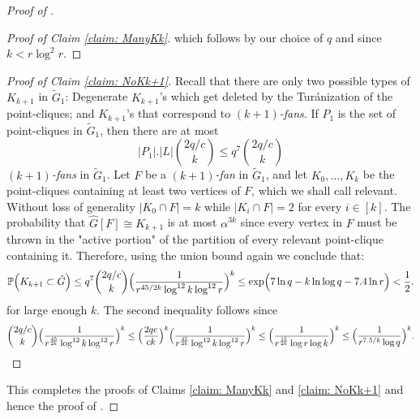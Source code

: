\documentclass[12pt]{article}
\newcommand{\red}[1]{\textcolor{red}{#1}}
\theoremstyle{definition}
\begin{document}
\begin{proof}[Proof of ]
\begin{proof}[Proof of Claim \ref{claim: ManyKk}]
        
			which follows by our choice of $q$ and since $k < r \log^2 r$.
		\end{proof}
		\begin{proof}[Proof of Claim \ref{claim: NoKk+1}] Recall that there are only two possible types of $K_{k+1}$ in $\tilde{G}_1$: Degenerate $K_{k+1}$'s which get deleted by the Turánization of the point-cliques; and $K_{k+1}$'s that correspond to $(k+1)$\textit{-fans}. If $P_1$ is the set of point-cliques in $\tilde{G}_1$, then there are at most 
			\[|P_1|.|L| \binom{2q/c}{k} \leq q^7 \binom{2q/c}{k}\]
			$(k+1)$\textit{-fans} in $\tilde{G}_1$.
			Let $F$ be a $(k+1)$\textit{-fan} in $\tilde{G}_1$, and let $K_0,\dots,K_k$ be the point-cliques containing at least two vertices  of $F$, which we shall call relevant. Without loss of generality $|K_0\cap F|=k$  while $|K_i\cap F|=2$ for every $i\in [k]$. The probability that $\hat{G}[F]\cong K_{k+1}$ is at most $\alpha^{3k}$ since every vertex in $F$ must be thrown in the "active portion" of the partition of every relevant point-clique containing it. Therefore, using the union bound again we conclude that:
			\[\mathbb{P}\Bigl(K_{k+1} \subset \hat{G} \Bigr) \leq q^7 \binom{2q/c}{k}\Bigl(\frac{1}{r^{45/2k}\log^{12}k \log^{12}r}\Bigr)^k\leq \exp \Bigl(7\ln q-k\ln\log q -7.4 \ln r\Bigr)<\frac{1}{2}.\]
			for large enough $k$. 
            The second inequality follows since 
            \[\binom{2q/c}{k} \Bigl(\frac{1}{r^{\frac{45}{2k}}\log^{12}k\log^{12}r}\Bigr)^k \leq \Bigl(\frac{2qe}{ck} \Bigr)^k\Bigl(\frac{1}{r^{\frac{45}{2k}}\log^{12}k\log^{12}r}\Bigr)^k \leq \Bigl(\frac{1}{r^{\frac{15}{2k}}\log r \log k}\Bigr)^k \leq \Bigl(\frac{1}{r^{7.5/k} \log q}\Bigr)^k.\]
		\end{proof}

        This completes the proofs of Claims \ref{claim: ManyKk} and \ref{claim: NoKk+1} and hence the proof of .
	\end{proof}
	
\end{document}
